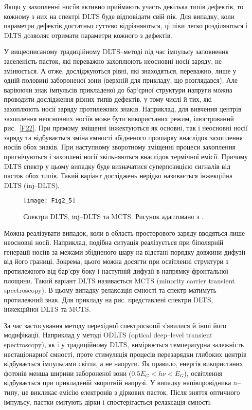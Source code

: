 Якщо у захопленні носіїв активно приймають участь декілька типів дефектів, то кожному
з них на спектрі DLTS буде відповідати свій пік.
Для випадку, коли параметри дефектів достатньо суттєво відрізняються, ці піки легко розділяються
і DLTS дозволяє отримати параметри кожного з дефектів.


У вищеописаному традиційному DLTS--методі під час імпульсу заповнення заселеність пасток,
які переважно захоплюють неосновні носії заряду, не змінюється.
А отже, досліджуються рівні, які знаходяться, переважно, лише у одній половині  забороненої зони
(верхній для прикладу, що розглядався).
Але варіюючи знак імпульсів прикладеної до бар'єрної структури напруги можна
проводити дослідження різних типів дефектів, у тому числі й тих, які захоплюють носії заряду протилежних знаків.
Наприклад, для вивчення центрів захоплення неосновних носіїв може бути використаних режим,
ілюстрований рис.~\ref{F22}.
При прямому зміщенні інжектуються як основні, так і неосновні носії заряду та
відбувається зміна ємності збідненого прошарку внаслідок захоплення носіїв
обох знаків.
При наступному зворотному зміщенні процеси захоплення пригнічуються і
захоплені носії звільняються внаслідок термічної емісії.
Причому DLTS спектр у цьому випадку буде визначатися суперпозицією сигналів
від пасток обох типів.
Такий варіант досліджень нерідко називається інжекційна DLTS (inj--DLTS).

\begin{figure}[!b]
\center
\vspace{-5mm}
\texttt{[image: Fig2\_5]}
\vspace{-3mm}
\caption{Спектри DLTS, inj--DLTS та MCTS.
Рисунок адаптовано з \cite{tuomisto2019}.
}
\vspace{-3mm}
\label{F25}
\end{figure}

Можна реалізувати випадок, коли в область просторового заряду вводяться лише неосновні носії.
Наприклад, подібна ситуація реалізується  при біполярній генерації носіїв за межами збідненого шару
на відстані порядку довжини дифузії від його границі.
Зокрема, цього можна досягти при освітленні структури з протилежного від бар'єру боку
і наступній дифузії в напрямку фронтальної площини.
Такий варіант DLTS називається MCTS (minority carrier transient spectroscopy).
В цьому випадку релаксація ємності та спектр матимуть протилежний знак.
Для прикладу на рис. представлені спектри DLTS, інжекційної DLTS та MCTS.


За час застосування методу перехідної спектроскопії з'явилися й інші його модифікації.
Наприклад у методі ODLTS (optical deep--level transient spectroscopy), як і у традиційному DLTS,
вимірюється температурна залежність нестаціонарної ємності, проте стимуляція
процесів перезарядки глибоких центрів відбувається імпульсами світла, а не напруги.
Як правило, енергія використаних фотонів менша ширини забороненої
зони ($0.5E_G<h\nu<E_G$),
освітлення відбувається при прикладеній зворотній напрузі.
У випадку напівпровідника $n$--типу, це викликає емісію електронів
з діркових пасток.
Після зняття оптичного імпульсу, пастки емітують дірки і спостерігається релаксація ємності.

